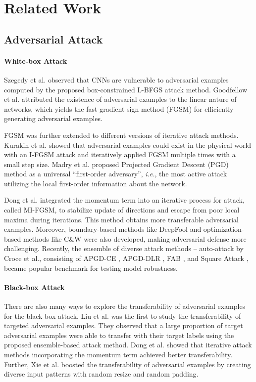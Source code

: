 \documentclass[final]{cvpr}
\begin{document}
\section{Related Work}
\subsection{Adversarial Attack}
\paragraph{White-box Attack}
Szegedy et al.  \cite{DBLP:journals/corr/SzegedyZSBEGF13} observed that CNNs are vulnerable to adversarial examples computed by the proposed box-constrained L-BFGS attack method. Goodfellow et al. \cite{DBLP:journals/corr/GoodfellowSS14} attributed the existence of adversarial examples to the linear nature of networks, which yields the fast gradient sign method (FGSM) for efficiently generating adversarial examples. 

FGSM was further extended to different versions of iterative attack methods. Kurakin et al. \cite{DBLP:conf/iclr/KurakinGB17a} showed that adversarial examples could exist in the physical world with an I-FGSM attack and iteratively applied FGSM multiple times with a small step size.  Madry et al. \cite{DBLP:conf/iclr/MadryMSTV18} proposed Projected Gradient Descent (PGD) method as a universal “first-order adversary”, {\it i.e.}, the most active attack utilizing the local first-order information about the network. 

Dong et al. \cite{DBLP:conf/cvpr/DongLPS0HL18} integrated the momentum term into an iterative process for attack, called MI-FGSM, to stabilize update of directions and escape from poor local maxima during iterations. This method obtains more transferable adversarial examples. Moreover, boundary-based methods like DeepFool \cite{DBLP:conf/cvpr/Moosavi-Dezfooli16} and optimization-based methods like C\&W \cite{DBLP:conf/sp/Carlini017} were also developed, making adversarial defense more challenging. Recently, the ensemble of diverse attack methods -- auto-attack \cite{croce2020reliable} by Croce et al., consisting of APGD-CE \cite{croce2020reliable}, APGD-DLR \cite{croce2020reliable}, FAB \cite{croce2020minimally}, and Square Attack \cite{ACFH2020square}, became popular benchmark for testing model robustness.  

\paragraph{Black-box Attack}
There are also many ways to explore the transferability of adversarial examples for the black-box attack. Liu et al. \cite{DBLP:conf/iclr/LiuCLS17} was the first to study the transferability of targeted adversarial examples. They observed that a large proportion
of target adversarial examples were able to transfer with their target labels using the proposed ensemble-based attack method. Dong et al. \cite{DBLP:conf/cvpr/DongLPS0HL18} showed that iterative attack methods incorporating the momentum term achieved better transferability. Further, Xie et al. \cite{DBLP:conf/cvpr/XieZZBWRY19} boosted the transferability of adversarial examples by creating diverse input patterns with random resize and random padding.
\end{document}
